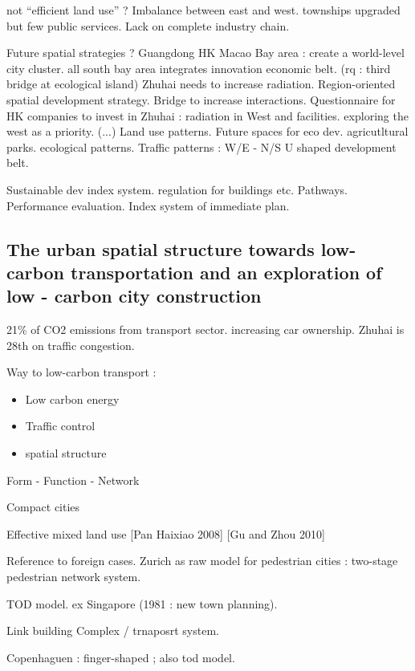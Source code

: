 not ``efficient land use'' ? Imbalance between east and west.
townships upgraded but few public services. Lack on complete industry chain.

Future spatial strategies ? Guangdong HK Macao Bay area : create a world-level city cluster. all south bay area integrates innovation economic belt. (rq : third bridge at ecological island)
Zhuhai needs to increase radiation.
Region-oriented spatial development strategy. Bridge to increase interactions. Questionnaire for HK companies to invest in Zhuhai : radiation in West and facilities. exploring the west as a priority.
(...)
Land use patterns.
Future spaces for eco dev. agricutltural parks.
ecological patterns.
Traffic patterns : W/E - N/S
U shaped development belt.


Sustainable dev index system. regulation for buildings etc.
Pathways. Performance evaluation.
Index system of immediate plan.




 




\subsection*{The urban spatial structure towards low-carbon transportation and an exploration of low - carbon city construction}

21\% of CO2 emissions from transport sector.
increasing car ownership. Zhuhai is 28th on traffic congestion.

Way to low-carbon transport : 
\begin{itemize}
\item Low carbon energy
\item Traffic control
\item spatial structure
\end{itemize}


Form - Function - Network

Compact cities

Effective mixed land use [Pan Haixiao 2008]
[Gu and Zhou 2010]

Reference to foreign cases. Zurich as raw model for pedestrian cities : two-stage pedestrian network system.

TOD model. ex Singapore (1981 : new town planning).

Link building Complex / trnaposrt system.

Copenhaguen : finger-shaped ; also tod model. 


